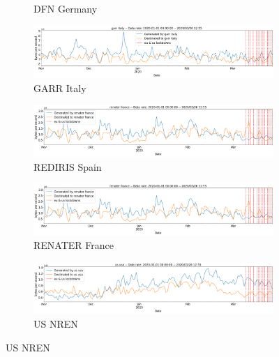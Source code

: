 \documentclass[10pt, journal, letterpaper]{IEEEtran}
\newcommand\linearFigSze{0.48}
\begin{document}
\begin{figure}
\begin{subfigure}{\linearFigSze\textwidth}
          \caption{DFN Germany}
          \label{fig:dfn_bps}
    \end{subfigure}
    \begin{subfigure}{\linearFigSze\textwidth}
          \centering
          \includegraphics[width=\columnwidth]{img/garr_bps.png}
          \caption{GARR Italy}
          \label{fig:garr_bps}
    \end{subfigure}
    \begin{subfigure}{\linearFigSze\textwidth}
          \centering
          \includegraphics[width=\columnwidth]{img/rediris_bps.png}
          \caption{REDIRIS Spain}
          \label{fig:rediris_bps}
    \end{subfigure}
    \begin{subfigure}{\linearFigSze\textwidth}
          \centering
          \includegraphics[width=\columnwidth]{img/renater_bps.png}
          \caption{RENATER France}
          \label{fig:renater_bps}
    \end{subfigure}
    \begin{subfigure}{\linearFigSze\textwidth}
          \centering
          \includegraphics[width=\columnwidth]{img/us_bps.png}
          \caption{US NREN}
          \label{fig:US_bps}
    \end{subfigure}

\end{figure}
\end{document}
